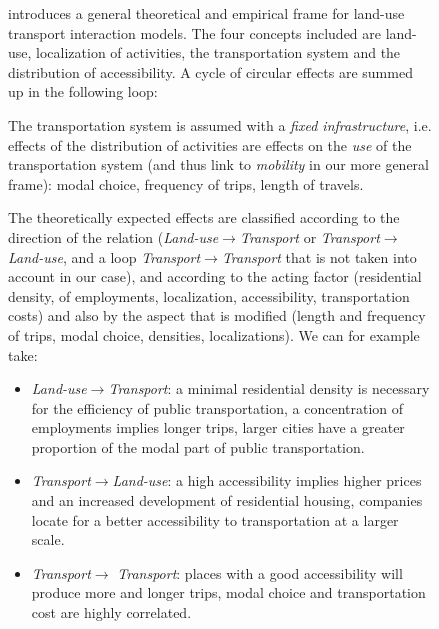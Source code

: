 \documentclass[galley]{jtlu-article-2col}
\begin{document}
\begin{figure}[h!]
	\begin{mdframed}
		
		\cite{wegener2004land} introduces a general theoretical and empirical frame for land-use transport interaction models. The four concepts included are land-use, localization of activities, the transportation system and the distribution of accessibility. A cycle of circular effects are summed up in the following loop:
		
		\begin{center}
		\bigskip
	
				
		\bigskip
		\end{center}
		
		The transportation system is assumed with a \emph{fixed infrastructure}, i.e. effects of the distribution of activities are effects on the \emph{use} of the transportation system (and thus link to \emph{mobility} in our more general frame): modal choice, frequency of trips, length of travels.
	
		
		The theoretically expected effects are classified according to the direction of the relation (\textit{Land-use}$\rightarrow$\textit{Transport} or \textit{Transport}$\rightarrow$\textit{Land-use}, and a loop \textit{Transport}$\rightarrow$\textit{Transport} that is not taken into account in our case), and according to the acting factor (residential density, of employments, localization, accessibility, transportation costs) and also by the aspect that is modified (length and frequency of trips, modal choice, densities, localizations). We can for example take:
		\begin{itemize}
		\item \textit{Land-use}$\rightarrow$\textit{Transport}: a minimal residential density is necessary for the efficiency of public transportation, a concentration of employments implies longer trips, larger cities have a greater proportion of the modal part of public transportation.
		\item \textit{Transport}$\rightarrow$\textit{Land-use}: a high accessibility implies higher prices and an increased development of residential housing, companies locate for a better accessibility to transportation at a larger scale.
		\item \textit{Transport}$\rightarrow$ \textit{Transport}: places with a good accessibility will produce more and longer trips, modal choice and transportation cost are highly correlated. 
		\end{itemize}
				

\end{mdframed}
\end{figure}
\end{document}
